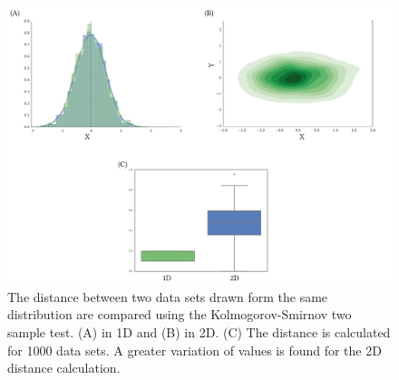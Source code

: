 \begin{figure}[htbp]
\centering
\includegraphics[scale=0.7]{chapterABCFlow/images/epsilon_same_box.png}
\caption[LoF caption]{\label{fig:epsilon_boxplt} The distance between two data sets drawn form the same distribution are compared using the Kolmogorov-Smirnov two sample test. (A) in 1D and (B) in 2D. (C) The distance is calculated for 1000 data sets. A greater variation of values is found for the 2D distance calculation.  }
\label{fig:normal_example}
\end{figure}
\clearpage


